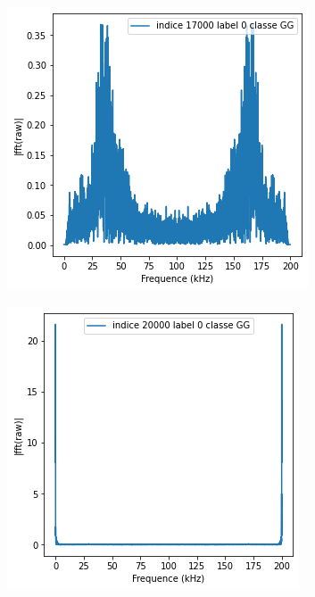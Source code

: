 \begin{figure}[!h]
\centering
  \begin{subfigure}[b]{0.3\textwidth}
    \includegraphics[width=\textwidth]{./images/17000fft.png}
  \end{subfigure}
  \begin{subfigure}[b]{0.3\textwidth}
    \includegraphics[width=\textwidth]{./images/20000fft.png}

\end{subfigure}
\end{figure}
